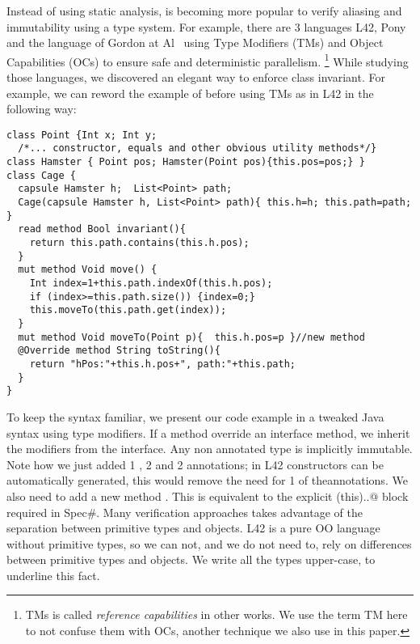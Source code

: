 Instead of using static analysis, 
is becoming more popular to verify aliasing and immutability using a type system.
For example, there are 3 languages L42, Pony and the language of Gordon at Al~\cite{}
using Type Modifiers (TMs) and Object Capabilities (OCs) to ensure safe and deterministic parallelism.%
\footnote{TMs is called \emph{reference capabilities} in other works. We use the term TM here
to not confuse them with OCs, another technique we also use in this paper.}
While studying those languages, we discovered an elegant way to enforce class invariant.
For example, we can reword the example of before using TMs as in L42 in the following way:
\begin{lstlisting}
class Point {Int x; Int y;
  /*... constructor, equals and other obvious utility methods*/}
class Hamster { Point pos; Hamster(Point pos){this.pos=pos;} }
class Cage {
  capsule Hamster h;  List<Point> path;
  Cage(capsule Hamster h, List<Point> path){ this.h=h; this.path=path; }
  read method Bool invariant(){
    return this.path.contains(this.h.pos);
  }
  mut method Void move() {
    Int index=1+this.path.indexOf(this.h.pos);
    if (index>=this.path.size()) {index=0;}
    this.moveTo(this.path.get(index));
  }
  mut method Void moveTo(Point p){  this.h.pos=p }//new method
  @Override method String toString(){
    return "hPos:"+this.h.pos+", path:"+this.path;
  }
}
\end{lstlisting}


To keep the syntax familiar, we present our code example in a tweaked Java syntax using type modifiers.
If a method override an interface method, we inherit the modifiers from the interface.
Any non annotated type is implicitly immutable.
Note how we just added 1 \Q@read@, 2 \Q@mut@ and 2 \Q@capsule@ annotations; in L42 constructors can be automatically generated, this would remove the need for 1 of the\Q@capsule@ annotations.
We also need to add a new method \Q@moveTo@. This is equivalent to the explicit \Q@expose(this){..}@
block required in Spec\#.
Many verification approaches takes advantage of the separation between primitive types and objects.
L42 is a pure OO language without primitive types, so we can not, and we do not need to, rely
on differences between primitive types and objects.
We write all the types upper-case, to underline this fact.


